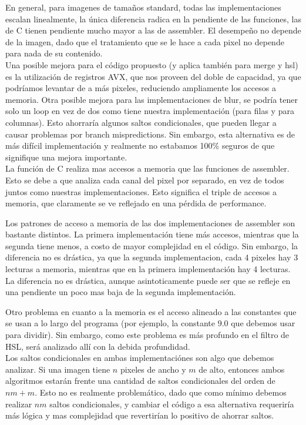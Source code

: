 En general, para imagenes de tamaños standard, todas las implementaciones escalan linealmente, la única diferencia radica en la pendiente de las funciones, las de C tienen pendiente mucho mayor a las de assembler. El desempeño no depende de la imagen, dado que el tratamiento que se le hace a cada pixel no depende para nada de su contenido.
\\

Una posible mejora para el código propuesto (y aplica también para merge y hsl) es la utilización de registros AVX, que nos proveen del doble de capacidad, ya que podríamos levantar de a más pixeles, reduciendo ampliamente los accesos a memoria.
Otra posible mejora para las implementaciones de blur, se podría tener solo un loop en vez de dos como tiene nuestra implementación (para filas y para columnas). Esto ahorraría algunos saltos condicionales, que pueden llegar a causar problemas por branch mispredictions.
Sin embargo, esta alternativa es de más difícil implementación y realmente no estabamos 100\% seguros de que signifique una mejora importante.
\\

La función de C realiza mas accesos a memoria que las funciones de assembler. Esto se debe a que analiza cada canal del pixel por separado, en vez de todos juntos como nuestras implementaciones. Esto significa el triple de accesos a memoria, que claramente se ve reflejado en una pérdida de performance.

Los patrones de acceso a memoria de las dos implementaciones de assembler son bastante distintos. La primera implementación tiene más accesos, mientras que la segunda tiene menos, a costo de mayor complejidad en el código. Sin embargo, la diferencia no es drástica, ya que la segunda implementacion, cada 4 pixeles hay 3 lecturas a memoria, mientras que en la primera implementación hay 4 lecturas. La diferencia no es drástica, aunque asintoticamente puede ser que se refleje en una pendiente un poco mas baja de la segunda implementación.

Otro problema en cuanto a la memoria es el acceso alineado a las constantes que se usan a lo largo del programa (por ejemplo, la constante 9.0 que debemos usar para dividir). Sin embargo, como este problema es más profundo en el filtro de HSL, será analizado allí con la debida profundidad.
\\

Los saltos condicionales en ambas implementaciónes son algo que debemos analizar. Si una imagen tiene $n$ pixeles de ancho y $m$ de alto, entonces ambos algoritmos estarán frente una cantidad de saltos condicionales del orden de $nm+m$.
Esto no es realmente problemático, dado que como mínimo debemos realizar $nm$ saltos condicionales, y cambiar el código a esa alternativa requeriría más lógica y mas complejidad que revertirían lo positivo de ahorrar saltos.
\\

